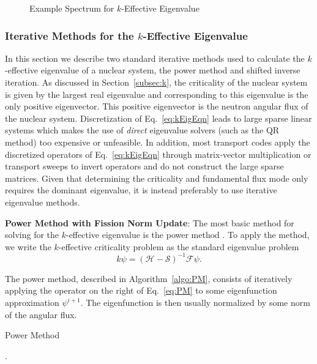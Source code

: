 \begin{figure}
	\centering
	\resizebox{0.5\textwidth}{!}{
	
	}
	\caption{Example Spectrum for $k$-Effective Eigenvalue}
	\label{fig:keffspec}
\end{figure}

\subsubsection{Iterative Methods for the $k$-Effective Eigenvalue}
In this section we describe two standard iterative methods used to calculate the $k$-effective eigenvalue of a nuclear system, the power method and shifted inverse iteration. As discussed in Section~\ref{subsec:k}, the criticality of the nuclear system is given by the largest real eigenvalue and corresponding to this eigenvalue is the only positive eigenvector. This positive eigenvector is the neutron angular flux of the nuclear system. Discretization of Eq.~\ref{eq:kEigEqn} leads to large sparse linear systems which makes the use of \textit{direct} eigenvalue solvers (such as the QR method) too expensive or unfeasible. In addition, most transport codes apply the discretized operators of Eq.~\ref{eq:kEigEqn} through matrix-vector multiplication or transport sweeps to invert operators and do not construct the large sparse matrices. Given that determining the criticality and fundamental flux mode only requires the dominant eigenvalue, it is instead preferably to use iterative eigenvalue methods.

\textbf{Power Method with Fission Norm Update}: The most basic method for solving for the $k$-effective eigenvalue is the power method \cite{lewis_computational_1984}. To apply the method, we write the $k$-effective criticality problem as the standard eigenvalue problem
\begin{equation}
k \psi = (\mathcal{H} - \mathcal{S})^{-1} \mathcal{F}\psi.
\label{eq:PM}
\end{equation}

The power method, described in Algorithm~\ref{algo:PM}, consists of iteratively applying the operator on the right of Eq.~\ref{eq:PM} to some eigenfunction approximation $\psi^{i+1}$. The eigenfunction is then usually normalized by some norm of the angular flux.%

\begin{algorithm}[H]
				\caption{Power Method \cite{lewis_computational_1984}}
				\begin{algorithmic}[1]
						.
					\ENDFOR
				\end{algorithmic}
				\label{algo:PM}
\end{algorithm}


